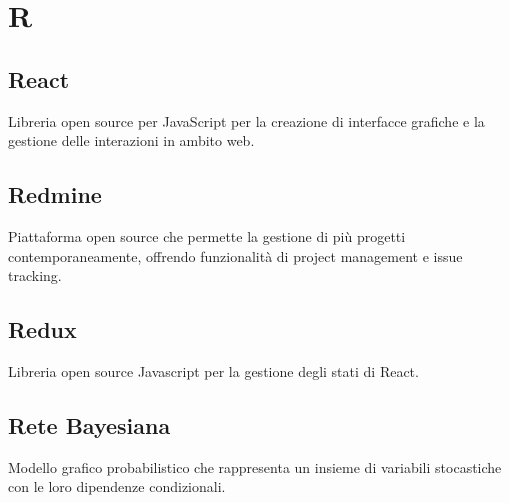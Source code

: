 \section*{R}
\subsection*{React}
Libreria open source per JavaScript per la creazione di interfacce grafiche e la gestione delle interazioni in ambito web.

\subsection*{Redmine}
Piattaforma open source che permette la gestione di più progetti contemporaneamente, offrendo funzionalità di project management e issue tracking.

\subsection*{Redux}
Libreria open source Javascript per la gestione degli stati di React.

\subsection*{Rete Bayesiana}
Modello grafico probabilistico che rappresenta un insieme di variabili stocastiche con le loro dipendenze condizionali.

